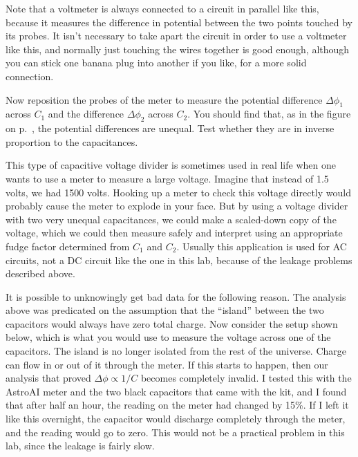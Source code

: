 
Note that a voltmeter is always connected to a circuit in parallel like this,
because it measures the difference in potential between the two points touched
by its probes. It isn't necessary to take apart the circuit in order to use
a voltmeter like this, and normally just touching the wires together is good
enough, although you can stick one banana plug into another if you like, for
a more solid connection.

Now reposition the probes of the meter to measure the potential difference
$\Delta\phi_1$ across $C_1$ and the difference $\Delta\phi_2$ across $C_2$.
You should find that, as in the  figure on p.~\pageref{fig:em-fie-covid-capacitor-params}, the potential
differences are unequal. Test whether they are in inverse proportion to the capacitances.

This type of capacitive voltage divider is sometimes used in real life when
one wants to use a meter to measure a large voltage. Imagine that instead of
1.5 volts, we had 1500 volts. Hooking up a meter to check this voltage directly would probably cause
the meter to explode in your face. But by using a voltage divider with two very
unequal capacitances, we could make a scaled-down copy of the voltage, which we
could then measure safely and interpret using an appropriate fudge factor determined from $C_1$ and $C_2$.
Usually this application is used for AC circuits, not a DC circuit
like the one in this lab, because of the leakage problems described above.

It is possible to unknowingly get bad data for the following reason. The analysis above
was predicated on the assumption that the ``island'' between the two capacitors would
always have zero total charge. Now consider the setup shown below, which is what you
would use to measure the voltage across one of the capacitors. The island is no longer
isolated from the rest of the universe. Charge can flow in or out of it through the
meter. If this starts to happen, then our analysis that proved $\Delta\phi \propto 1/C$ becomes
completely invalid. I tested this with the AstroAI meter and the two black capacitors
that came with the kit, and I found that after half an hour, the reading on the meter had
changed by 15\%. If I left it like this overnight, the capacitor would discharge completely
through the meter, and the reading would go to zero. This would not be a practical problem in 
this lab, since the leakage is fairly slow. 

